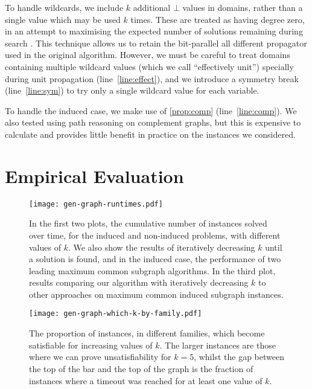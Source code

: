 \documentclass[letterpaper]{article}
\theoremstyle{definition}
\begin{document}
To handle wildcards, we include $k$ additional $\bot$ values in domains, rather than a single value
which may be used $k$ times. These are treated as having degree zero, in an attempt to maximising
the expected number of solutions remaining during search \cite{DBLP:conf/ijcai/McCreeshPT16}. This
technique allows us to retain the bit-parallel all different propagator used in the original
algorithm. However, we must be careful to treat domains containing multiple wildcard values (which
we call ``effectively unit'') specially during unit propagation (line~\ref{line:effect}), and we
introduce a symmetry break (line~\ref{line:sym}) to try only a single wildcard value for each
variable.

To handle the induced case, we make use of \cref{prop:comp} (line~\ref{line:comp}). We also tested
using path reasoning on complement graphs, but this is expensive to calculate and provides little
benefit in practice on the instances we considered.

\section{Empirical Evaluation}\label{section:evaluation}

\begin{figure*}[tb]
    \centering
    \texttt{[image: gen-graph-runtimes.pdf]}
    \caption{In the first two plots, the cumulative number of instances solved over time, for the
        induced and non-induced problems, with different values of $k$. We also show the results of
        iteratively decreasing $k$ until a solution is found, and in the induced case, the
        performance of two leading maximum common subgraph algorithms. In the third plot, results
        comparing our algorithm with iteratively decreasing $k$ to other approaches on maximum
        common induced subgraph instances.}\label{figure:runtimes}
\end{figure*}

\begin{figure*}[tb]
    \centering
    \texttt{[image: gen-graph-which-k-by-family.pdf]}
    \caption{The proportion of instances, in different families, which become satisfiable for
    increasing values of $k$. The larger instances are those where we can prove unsatisfiability for
    $k = 5$, whilst the gap between the top of the bar and the top of the graph is the fraction of
    instances where a timeout was reached for at least one value of $k$.}\label{figure:which-k}
\end{figure*}
\end{document}
